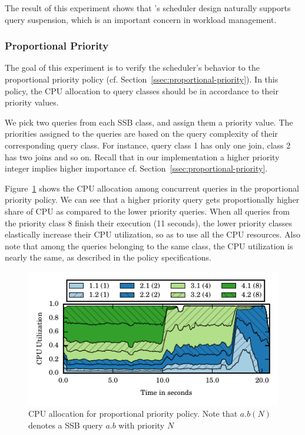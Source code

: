 The result of this experiment shows that \sys{}'s scheduler design naturally supports 
query suspension, which is an important concern in workload management. 

\subsubsection{Proportional Priority}\label{sssec:pp-policy-exp}
The goal of this experiment is to verify the scheduler's behavior to the proportional priority policy (cf. 
Section~\ref{ssec:proportional-priority}).
In this policy, the CPU allocation to query classes should be in accordance to their priority values.

We pick two queries from each SSB class, and assign them a priority value. 
The priorities assigned to the queries are based on the query complexity of their corresponding query class. 
For instance, query class 1 has only one join, class 2 has two joins and so on.
Recall that in our implementation a higher priority integer implies higher importance cf. 
Section~\ref{ssec:proportional-priority}.

Figure~\ref{fig:pp-cpu-util} shows the CPU allocation among concurrent queries in the proportional priority policy.
We can see that a higher priority query gets proportionally higher share of CPU as 
compared to the lower priority queries.
When all queries from the priority class 8 finish their execution (11 seconds), the 
lower priority classes elastically increase their CPU utilization, so as to use all the CPU 
resources. 
Also note that among the queries belonging to the same class, the CPU utilization is 
nearly the same, as described in the policy specifications.

\begin{figure}[]
	\centering
	\includegraphics[width=\columnwidth]{figures/ssb-priority-uniform-2queries-perclass-cpu-util.pdf}
	\vspace{-2.5em}
	\caption{CPU allocation for proportional priority policy. Note that $a.b  (N)$ denotes a SSB query $a.b$ with priority $N$}
	\label{fig:pp-cpu-util}
\end{figure}



